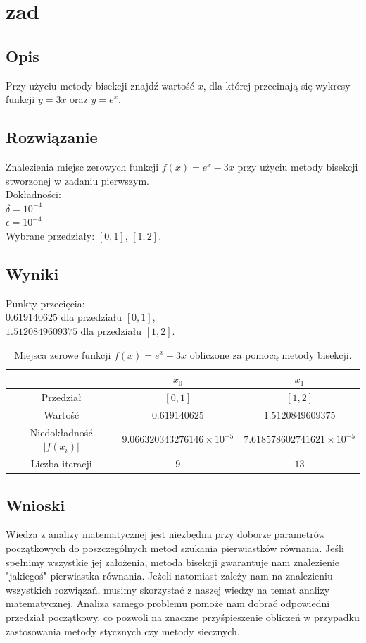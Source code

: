 \documentclass[10pt,a4paper, polish]{article}
\begin{document}
\section{zad}

\subsection*{Opis}
Przy użyciu metody bisekcji znajdź wartość $x$, dla której przecinają się wykresy funkcji $y=3x$ oraz $y=e^x$.

\subsection*{Rozwiązanie}
Znalezienia miejsc zerowych funkcji $f(x) = e^x - 3x$ przy użyciu metody bisekcji stworzonej w zadaniu pierwszym.\\
Dokładności:\\
$\delta = 10^{-4}$\\
$\epsilon = 10^{-4}$\\
Wybrane przedziały: $[0, 1]$, $[1, 2]$.

\subsection*{Wyniki}
Punkty przecięcia:\\
$0.619140625$ dla przedziału $[0,1]$,\\
$1.5120849609375$ dla przedziału $[1,2]$.

\begin{table}[h]
        \centering
        \footnotesize
\begin{tabular}{c|c|c}
& $x_0$ & $x_1$ \\ \hline
Przedział & $[0, 1]$ & $[1, 2]$ \\ 
Wartość & $0.619140625$ & $1.5120849609375$ \\ 
Niedokładność $|f(x_i)|$ & $9.066320343276146 \times 10^{-5}$ & $7.618578602741621 \times 10^{-5}$ \\
Liczba iteracji &$9$&$13$ \\
\end{tabular}
\caption{Miejsca zerowe funkcji $f(x) = e^x - 3x$ obliczone za pomocą metody bisekcji.}
\label{table:2}
\end{table}	

\subsection*{Wnioski}
Wiedza z analizy matematycznej jest niezbędna przy doborze parametrów początkowych do poszczególnych metod szukania pierwiastków równania. Jeśli spełnimy wszystkie jej założenia, metoda bisekcji gwarantuje nam znalezienie "jakiegoś" pierwiastka równania. Jeżeli natomiast zależy nam na znalezieniu wszystkich rozwiązań, musimy skorzystać z naszej wiedzy na temat analizy matematycznej. Analiza samego problemu pomoże nam dobrać odpowiedni przedział początkowy, co pozwoli na znaczne przyśpieszenie obliczeń w przypadku zastosowania metody stycznych czy metody siecznych.
\end{document}
